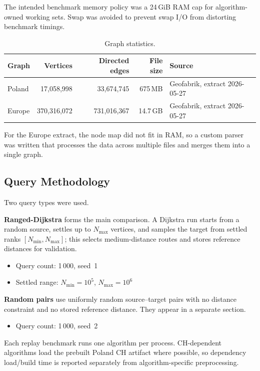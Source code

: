 \documentclass[11pt,a4paper]{article}
\begin{document}
The intended benchmark memory policy was a 24\,GiB RAM cap for algorithm-owned
working sets.  Swap was avoided to prevent swap I/O from distorting benchmark
timings.

\begin{table}[h]
\centering
\caption{Graph statistics.}
\begin{tabular}{lrrrl}
  \toprule
  \textbf{Graph} & \textbf{Vertices} & \textbf{Directed edges} & \textbf{File size} & \textbf{Source} \\
  \midrule
  Poland  & 17,058,998  & 33,674,745  & 675\,MB  & Geofabrik, extract 2026-05-27 \\
  Europe  & 370,316,072 & 731,016,367 & 14.7\,GB & Geofabrik, extract 2026-05-27 \\
  \bottomrule
\end{tabular}
\end{table}

For the Europe extract, the node map did not fit in RAM, so a custom parser was
written that processes the data across multiple files and merges them into a
single graph.

\subsection*{Query Methodology}

Two query types were used.

\textbf{Ranged-Dijkstra} forms the main comparison.  A Dijkstra run starts from a
random source, settles up to $N_{\max}$ vertices, and samples the target from
settled ranks $[N_{\min}, N_{\max}]$; this selects medium-distance routes and
stores reference distances for validation.

\begin{itemize}
  \item Query count: 1\,000, seed~1
  \item Settled range: $N_{\min}=10^5$, $N_{\max}=10^6$
\end{itemize}

\textbf{Random pairs} use uniformly random source--target pairs with no distance
constraint and no stored reference distance.  They appear in a separate section.

\begin{itemize}
  \item Query count: 1\,000, seed~2
\end{itemize}

Each replay benchmark runs one algorithm per process.  CH-dependent algorithms
load the prebuilt Poland CH artifact where possible, so dependency load/build
time is reported separately from algorithm-specific preprocessing.
\end{document}
